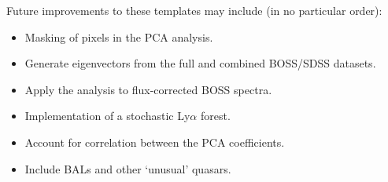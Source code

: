 \documentclass[11pt]{article}
\begin{document}
Future improvements to these templates may include (in no particular
order): 

\begin{itemize}
\item Masking of pixels in the PCA analysis.
\item Generate eigenvectors from the full and combined BOSS/SDSS datasets.
\item Apply the analysis to flux-corrected BOSS spectra.
\item Implementation of a stochastic Ly$\alpha$ forest.
\item Account for correlation between the PCA coefficients. 
\item Include BALs and other `unusual' quasars.
\end{itemize}

%
%
%
\end{document}
